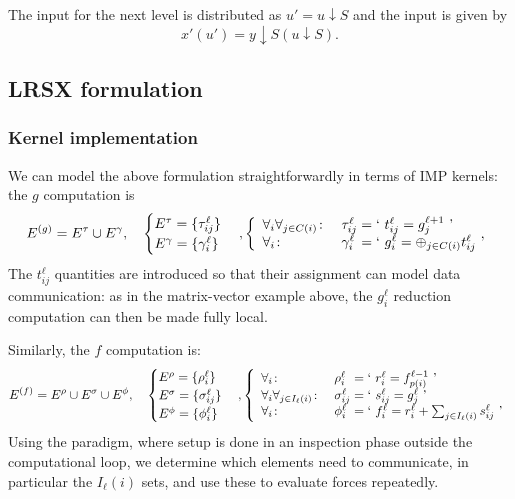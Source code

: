 The input for the next level is distributed as $u'=u\downarrow S$
and the input is given by
\[ x'(u') = y\downarrow S(u\downarrow S). \]

\subsection{LRSX formulation}

\subsubsection{Kernel implementation}

We can model the above formulation straightforwardly in terms of
\ac{IMP} kernels: the $g$ computation is
\begin{equation}
 E^{(g)}=E^\tau\cup E^\gamma,\quad
\begin{cases}
  E^\tau = \{ \tau^\ell_{ij} \} \\ 
  E^\gamma = \{ \gamma^\ell_i \} \\
\end{cases}
,
\left\{\begin{array}{ll@{{}={}}l}
  \forall_i\forall_{j\in C(i)}\colon 
  & \tau^\ell_{ij}&\hbox{` $t^\ell_{ij}=g^{\ell+1}_j$ '}\\
  \forall_i\colon
  & \gamma^\ell_i &\hbox{` $g^\ell_i=\oplus_{j\in C(i)}t^\ell_{ij}$ '}
\end{array}\right.
\label{eq:bh-g-kernel}
\end{equation}
The $t^\ell_{ij}$ quantities are introduced so that their assignment
can model data communication: as in the matrix-vector example above,
the $g^\ell_i$ reduction computation can then be made fully local.

Similarly, the $f$ computation is:
\[ E^{(f)}=E^\rho\cup E^\sigma\cup E^\phi,\quad
\begin{cases}
  E^\rho = \{ \rho^\ell_i \} \\
  E^\sigma = \{ \sigma^\ell_{ij} \} \\
  E^\phi = \{ \phi^\ell_i \} \\
\end{cases}
,
\left\{\begin{array}{ll@{{}={}}l}
  \forall_i\colon
  & \rho^\ell_i & \hbox{` $r^\ell_i = f^{\ell-1}_{p(i)}$ '} \\
  \forall_i\forall_{j\in I_\ell(i)}\colon
  & \sigma^\ell_{ij} & \hbox{` $s^\ell_{ij} = g^\ell_j$ '} \\
  \forall_i\colon
  & \phi^\ell_i & \hbox{` 
          $f^\ell_i = r^\ell_i + \sum_{j\in I_\ell(i)} s^\ell_{ij}$ '} \\
\end{array}\right.
\]
Using the  paradigm, where setup is done 
in an inspection phase outside the computational loop, we 
determine which elements need to communicate, in particular the
$I_\ell(i)$ sets, and use these to evaluate forces repeatedly.

